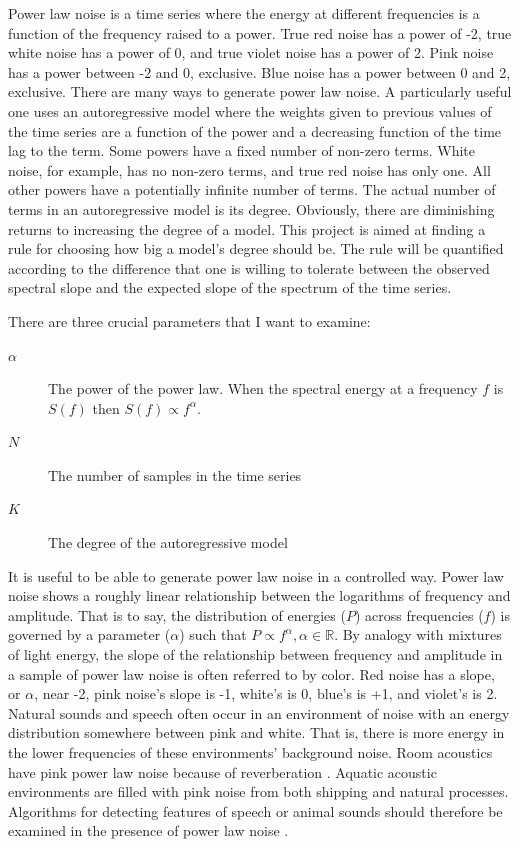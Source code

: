 \documentclass[preprint]{JASA}
\begin{document}
Power law noise is a time series where the energy at different frequencies is a function of the frequency raised to a power.
True red noise has a power of -2, true white noise has a power of 0, and true violet noise has a power of 2.
Pink noise has a power between -2 and 0, exclusive.
Blue noise has a power between 0 and 2, exclusive.
There are many ways to generate power law noise.
A particularly useful one uses an autoregressive model where the weights given to previous values of the time series are a function of the power and a
decreasing function of the time lag to the term.
Some powers have a fixed number of non-zero terms.
White noise, for example, has no non-zero terms, and true red noise has only one.
All other powers have a potentially infinite number of terms.
The actual number of terms in an autoregressive model is its degree.
Obviously, there are diminishing returns to increasing the degree of a model.
This project is aimed at finding a rule for choosing how big a model's degree should be.
The rule will be quantified according to the difference that one is willing to tolerate between the observed spectral slope and the expected slope of the spectrum of the time series.

There are three crucial parameters that I want to examine:
\begin{description}
\item[$\alpha$] The power of the power law.
  When the spectral energy at a
  frequency $f$ is  $S(f)$ then $S(f) \propto f^{\alpha}$.
\item[$N$] The number of samples in the time series
\item[$K$] The degree of the autoregressive model
\end{description}

It is useful to be able to generate power law noise in a controlled way.
Power law noise shows a roughly linear relationship between the logarithms of frequency and amplitude.
That is to say, the distribution of energies ($P$) across frequencies ($f$) is governed by a parameter ($\alpha$) such that $P \propto f^{\alpha}, \alpha \in
\mathbb{R}$.
By analogy with mixtures of light energy, the slope of the relationship between frequency and amplitude in a sample of power law noise is often referred to by color.
Red noise has a slope, or $\alpha$, near -2, pink noise's slope is -1, white's is 0, blue's is +1, and violet's is 2.
Natural sounds and speech often occur in an environment of noise with an energy distribution somewhere between pink and white.
That is, there is more energy in the lower frequencies of these environments' background noise.
Room acoustics have pink power law noise because of reverberation \citep{summers:2013}.
Aquatic acoustic environments are filled with pink noise from both shipping \citep{helbleetal:2012} and natural processes.
Algorithms for detecting features of speech or animal sounds should therefore be examined in the presence of power law noise \citep{skowronski:fenton:2008}.
\end{document}
